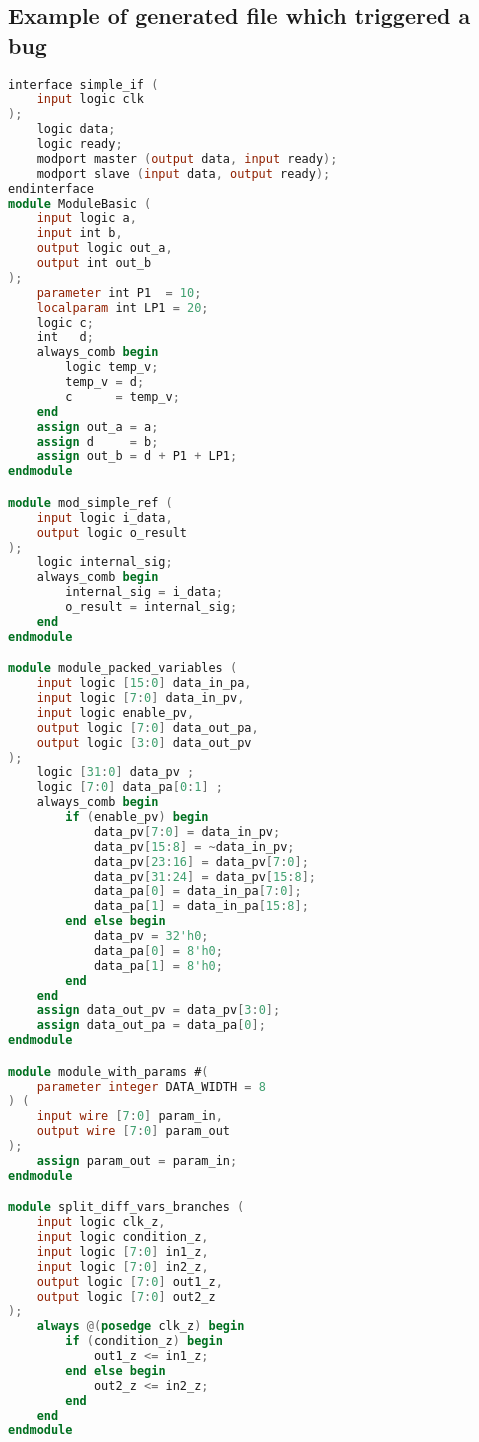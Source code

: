 
\small
\subsection*{Example of generated file which triggered a bug}
\begin{lstlisting}[language=Verilog]
interface simple_if (
    input logic clk
);
    logic data;
    logic ready;
    modport master (output data, input ready);
    modport slave (input data, output ready);
endinterface
module ModuleBasic (
    input logic a,
    input int b,
    output logic out_a,
    output int out_b
);
    parameter int P1  = 10;
    localparam int LP1 = 20;
    logic c;
    int   d;
    always_comb begin
        logic temp_v;
        temp_v = d;
        c      = temp_v;
    end
    assign out_a = a;
    assign d     = b;
    assign out_b = d + P1 + LP1;
endmodule

module mod_simple_ref (
    input logic i_data,
    output logic o_result
);
    logic internal_sig;
    always_comb begin
        internal_sig = i_data;
        o_result = internal_sig;
    end
endmodule

module module_packed_variables (
    input logic [15:0] data_in_pa,
    input logic [7:0] data_in_pv,
    input logic enable_pv,
    output logic [7:0] data_out_pa,
    output logic [3:0] data_out_pv
);
    logic [31:0] data_pv ;
    logic [7:0] data_pa[0:1] ;
    always_comb begin
        if (enable_pv) begin
            data_pv[7:0] = data_in_pv;
            data_pv[15:8] = ~data_in_pv;
            data_pv[23:16] = data_pv[7:0];
            data_pv[31:24] = data_pv[15:8];
            data_pa[0] = data_in_pa[7:0];
            data_pa[1] = data_in_pa[15:8];
        end else begin
            data_pv = 32'h0;
            data_pa[0] = 8'h0;
            data_pa[1] = 8'h0;
        end
    end
    assign data_out_pv = data_pv[3:0];
    assign data_out_pa = data_pa[0];
endmodule

module module_with_params #(
    parameter integer DATA_WIDTH = 8
) (
    input wire [7:0] param_in,
    output wire [7:0] param_out
);
    assign param_out = param_in;
endmodule

module split_diff_vars_branches (
    input logic clk_z,
    input logic condition_z,
    input logic [7:0] in1_z,
    input logic [7:0] in2_z,
    output logic [7:0] out1_z,
    output logic [7:0] out2_z
);
    always @(posedge clk_z) begin
        if (condition_z) begin
            out1_z <= in1_z;
        end else begin
            out2_z <= in2_z;
        end
    end
endmodule


\end{lstlisting}

